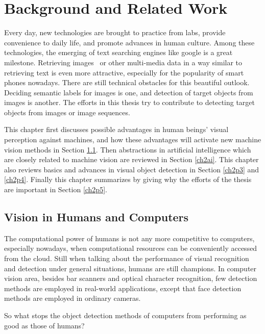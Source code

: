 \chapter{Background and Related Work}
\label{chp2}


Every day, new technologies are brought to practice from labs, provide convenience to daily life, and promote advances in human culture. Among these technologies, the emerging of text searching engines like google is a great milestone. Retrieving images~\citep{bisearch} or other multi-media data  in a way similar to retrieving text is even more attractive, especially for the popularity of smart phones nowadays. There are still technical obstacles for this beautiful outlook. Deciding semantic labels for images is one, and detection of target objects from images is another. The efforts in this thesis try to contribute to detecting target objects from images or image sequences.

This chapter first discusses possible advantages in human beings' visual perception against machines, and how these advantages will activate new machine vision methods in Section \ref{ch2vh}. Then abstractions in artificial intelligence which are closely related to machine vision are reviewed in Section \ref{ch2ai}. This chapter also reviews basics and advances in visual object detection in Section \ref{ch2p3} and \ref{ch2p4}. Finally this chapter summarizes by giving why the efforts of the thesis are important in Section \ref{ch2p5}.

\section{Vision in Humans and Computers}
\label{ch2vh}
The computational power of humans is not any more competitive to computers, especially nowadays, when computational resources can be conveniently accessed from the cloud.
Still when talking about the performance of visual recognition and detection under general situations, humans are still champions. In computer vision area, besides bar scanners and optical character recognition, few detection methods are employed in real-world applications, except that face detection methods are employed in ordinary cameras.

So what stops the object detection methods of computers from performing as good as those of humans?

